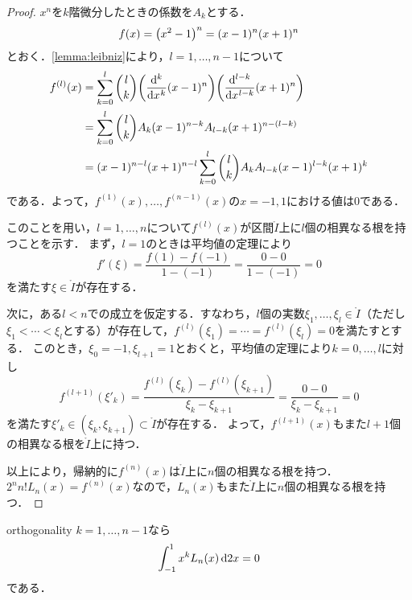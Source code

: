 \documentclass[a4paper]{ltjsarticle}
\theoremstyle{definition}
\DeclarePairedDelimiter{\pqty}{\lparen}{\rparen}
\newcommand{\dd}[1]{\dl2#1}
\begin{document}
\begin{proof}
  $x^n$を$k$階微分したときの係数を$A_k$とする．
  \[
    f(x) = \pqty*{x^2-1}^n = (x-1)^n (x+1)^n
  \]
  とおく．\cref{lemma:leibniz}により，$l=1,\dots,n-1$について
  \begin{align*}
    f^{(l)}(x)
    &= \sum_{k=0}^l \binom{l}{k} \pqty*{\diff*[k]{(x-1)^n}{x}} \pqty*{\diff*[l-k]{(x+1)^n}{x}} \\
    &= \sum_{k=0}^l \binom{l}{k} A_{k} (x-1)^{n-k} A_{l-k} (x+1)^{n-(l-k)} \\
    &= (x-1)^{n-l} (x+1)^{n-l} \sum_{k=0}^l \binom{l}{k} A_{k} A_{l-k} (x-1)^{l-k} (x+1)^k
  \end{align*}
  である．よって，$f^{(1)}(x),\dots,f^{(n-1)}(x)$の$x=-1,1$における値は$0$である．

  このことを用い，$l=1,\dots,n$について$f^{(l)}(x)$が区間$\mathring{I}$上に$l$個の相異なる根を持つことを示す．
  まず，$l=1$のときは平均値の定理により
  \[
    f'(\xi) = \frac{f(1)-f(-1)}{1-(-1)} = \frac{0-0}{1-(-1)}=0
  \]
  を満たす$\xi \in \mathring{I}$が存在する．

  次に，ある$l<n$での成立を仮定する．すなわち，$l$個の実数$\xi_1, \dots, \xi_l \in \mathring{I}$（ただし$\xi_1 < \cdots < \xi_l$とする）が存在して，$f^{(l)}(\xi_1) = \cdots = f^{(l)}(\xi_l) = 0$を満たすとする．
  このとき，$\xi_0 = -1, \xi_{l+1} = 1$とおくと，平均値の定理により$k=0,\dots,l$に対し
  \[
    f^{(l+1)}(\xi'_k) = \frac{f^{(l)}(\xi_k) - f^{(l)}(\xi_{k+1})}{\xi_k - \xi_{k+1}} = \frac{0 - 0}{\xi_k - \xi_{k+1}} = 0
  \]
  を満たす$\xi'_k \in (\xi_k, \xi_{k+1}) \subset \mathring{I}$が存在する．
  よって，$f^{(l+1)}(x)$もまた$l+1$個の相異なる根を$\mathring{I}$上に持つ．

  以上により，帰納的に$f^{(n)}(x)$は$\mathring{I}$上に$n$個の相異なる根を持つ．
  $2^n n! L_n(x) = f^{(n)}(x)$なので，$L_n(x)$もまた$\mathring{I}$上に$n$個の相異なる根を持つ．
\end{proof}

\begin{theorem}{}{orthogonality}
  $k = 1,\dots,n-1$なら
  \[
    \int_{-1}^1 x^k L_n(x) \dd{x} = 0
  \]
  である．
\end{theorem}
\end{document}
